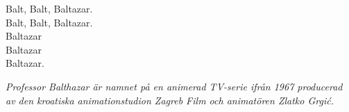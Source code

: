 \vspace{10pt}
Balt, Balt, Baltazar.\\
Balt, Balt, Baltazar.\\
Baltazar\\
Baltazar\\
Baltazar.
\par
\vspace{10pt}
{\footnotesize\textit{Professor Balthazar är namnet på en animerad
TV-serie ifrån 1967 producerad av den kroatiska animationstudion
Zagreb Film och animatören Zlatko Grgić.}}
